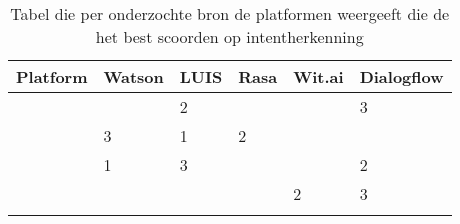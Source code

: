 \begin{center}
    \begin{longtable}{| l | l | l | l | l | l |}
        \hline
        \textbf{Platform } &  \textbf{Watson} & \textbf{LUIS} & \textbf{Rasa}& \textbf{Wit.ai} & \textbf{Dialogflow} \\  \hline
        \textbf{\textcite{Russis2018}} & \cellcolor[rgb]{1,0.8431,0} \centering{1} & \cellcolor[rgb]{0.7529,0.7529,0.7529} 2 & & & \cellcolor[rgb]{0.80,0.50,0.20} 3 \\ \hline \hline
        \textbf{\textcite{Langen2017}} & \cellcolor[rgb]{0.80,0.50,0.20} 3 & \cellcolor[rgb]{1,0.8431,0} 1 & \cellcolor[rgb]{0.7529,0.7529,0.7529} 2 & & \\ \hline
        \textbf{\textcite{Savenkov2017}} & \cellcolor[rgb]{1,0.8431,0} 1 & \cellcolor[rgb]{0.80,0.50,0.20} 3 & & & \cellcolor[rgb]{0.7529,0.7529,0.7529} 2 \\ \hline \hline
        \textbf{\textcite{Coucke2017}} & & & & \cellcolor[rgb]{0.7529,0.7529,0.7529} 2 & \cellcolor[rgb]{0.80,0.50,0.20} 3 \\ \hline 
        \caption{Tabel die per onderzochte bron de platformen weergeeft die de het best scoorden op intentherkenning}                                    
    \end{longtable}
\end{center}














